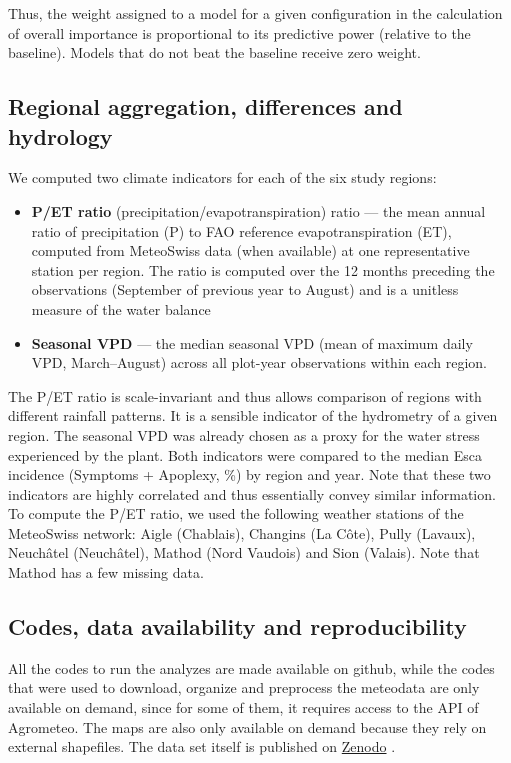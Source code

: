 Thus, the weight assigned to a model for a given configuration in the calculation of overall importance is proportional to its predictive power (relative to the baseline). Models that do not beat the baseline receive zero weight.

\subsection{Regional aggregation, differences and hydrology}

We computed two climate indicators for each of the six study regions:

\begin{itemize}
\item
  \textbf{P/ET ratio} (precipitation/evapotranspiration) ratio --- the mean annual ratio of precipitation (P) to FAO reference evapotranspiration (ET), computed from MeteoSwiss data (when available) at one representative station per region. The ratio is computed over the 12 months preceding the observations (September of previous year to August) and is a unitless measure of the water balance
\item
  \textbf{Seasonal VPD} --- the median seasonal VPD (mean of maximum daily VPD, March--August) across all plot-year observations within each region.
\end{itemize}

The P/ET ratio is scale-invariant and thus allows comparison of regions with different rainfall patterns. It is a sensible indicator of the hydrometry of a given region. The seasonal VPD was already chosen as a proxy for the water stress experienced by the plant. Both indicators were compared to the median Esca incidence (Symptoms + Apoplexy, \%) by region and year. Note that these two indicators are highly correlated and thus essentially convey similar information. To compute the P/ET ratio, we used the following weather stations of the MeteoSwiss network: Aigle (Chablais), Changins (La Côte), Pully (Lavaux), Neuchâtel (Neuchâtel), Mathod (Nord Vaudois) and Sion (Valais). Note that Mathod has a few missing data.

\subsection{Codes, data availability and reproducibility}

All the codes to run the analyzes are made available on github, while the codes that were used to download, organize and preprocess the meteodata are only available on demand, since for some of them, it requires access to the API of Agrometeo. The maps are also only available on demand because they rely on external shapefiles. The data set itself is published on \href{https://doi.org/10.5281/zenodo.21704547}{Zenodo} \citep{fabre_esca_2026}.
